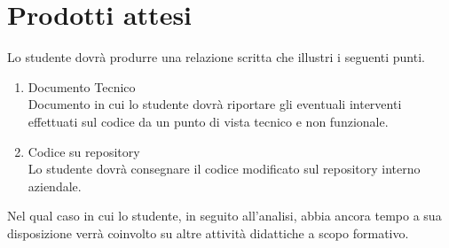 \section*{Prodotti attesi}
Lo studente dovrà produrre una relazione scritta che illustri i seguenti punti.
\begin{enumerate}
    \item Documento Tecnico \\
    Documento in cui lo studente dovrà riportare gli eventuali interventi effettuati sul codice da un punto di vista tecnico e non funzionale.

    \item Codice su repository \\
    Lo studente dovrà consegnare il codice modificato sul repository interno aziendale.
\end{enumerate}

Nel qual caso in cui lo studente, in seguito all’analisi, abbia ancora tempo a sua disposizione verrà coinvolto
su altre attività didattiche a scopo formativo.

